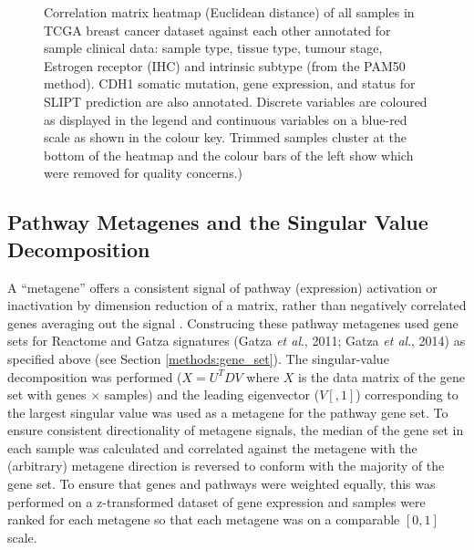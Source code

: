 \begin{figure}[!ht]
   \caption[Correlation analysis and sample removal]{ Correlation matrix heatmap (Euclidean distance) of all samples in TCGA breast cancer dataset against each other annotated for sample clinical data: sample type, tissue type, tumour stage, Estrogen receptor (IHC) and intrinsic subtype (from the PAM50 method). CDH1 somatic mutation, gene expression, and status for SLIPT prediction are also annotated. Discrete variables are coloured as displayed in the legend and continuous variables on a blue-red scale as shown in the colour key. Trimmed samples cluster at the bottom of the heatmap and the colour bars of the left show which were removed for quality concerns.)}
\label{fig:corr_map}
\end{figure}

\subsection{Pathway Metagenes and the Singular Value Decomposition} \label{methods:metagene}
A ``metagene'' offers a consistent signal of pathway (expression) activation or inactivation by dimension reduction of a matrix, rather than negatively correlated genes averaging out the signal \cite{Huang2003}. Construcing these pathway metagenes used gene sets for Reactome and Gatza signatures (Gatza \textit{et al}., 2011; Gatza \textit{et al}., 2014) as specified above (see Section \ref{methods:gene_set}). The singular-value decomposition was performed ($X = U^{T} D V$ where $X$ is the data matrix of the gene set with genes $\times$ samples) and the leading eigenvector ($V[,1]$) corresponding to the largest singular value was used as a metagene for the pathway gene set. To ensure consistent directionality of metagene signals, the median of the gene set in each sample was calculated and correlated against the metagene with the (arbitrary) metagene direction is reversed to conform with the majority of the gene set. To ensure that genes and pathways were weighted equally, this was performed on a z-transformed dataset of gene expression and samples were ranked for each metagene so that each metagene was on a comparable $[0,1]$ scale. 

